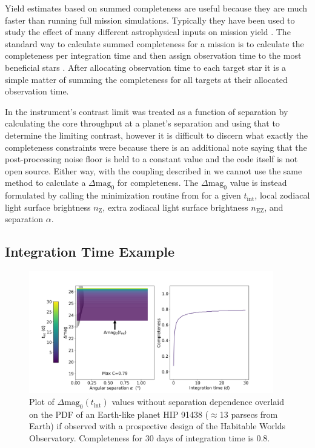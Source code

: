 Yield estimates based on summed completeness are useful because they are much
faster than running full mission simulations. Typically they have been used to
study the effect of many different astrophysical inputs on mission yield
\citep{starkMaximizingExoEarthCandidate2014, Stark2016,
starkExoEarthYieldLandscape2019}. The standard way to calculate summed
completeness for a mission is to calculate the completeness per integration
time and then assign observation time to the most beneficial stars
\citep{hunyadiSingleVisitCompleteness2005,
starkMaximizingExoEarthCandidate2014}. After allocating observation time to
each target star it is a simple matter of summing the completeness for all
targets at their allocated observation time.

In \citep{starkExoEarthYieldLandscape2019} the instrument's contrast limit was
treated as a function of separation by calculating the core throughput at a
planet's separation and using that to determine the limiting contrast, however
it is difficult to discern what exactly the completeness constraints were because
there is an additional note saying that the post-processing noise floor is held to a constant
value and the code itself is not open source. Either way, with the
coupling described in  we cannot use the same method to calculate
a $\Delta\textrm{mag}_0$ for completeness. The $\Delta\textrm{mag}_0$ value is instead
formulated by calling the minimization routine from  
for a given $t_\textrm{int}$, local zodiacal light surface brightness $n_\textrm{Z}$,
extra zodiacal light surface brightness $n_\textrm{EZ}$, and separation $\alpha$.

\subsection{Integration Time Example}
\label{sub:comp_per_inttime}

\begin{figure}
  \begin{center}
    \includegraphics[width=0.95\textwidth]{ch3/figures/default_dmag_curve.png}
  \end{center}
  \caption{Plot of $\Delta\textrm{mag}_0(t_\textrm{int})$ values without separation dependence
  overlaid on the PDF of an Earth-like planet HIP 91438 ($\approx$13 parsecs from Earth)
  if observed with a prospective design of the Habitable Worlds Observatory.
  Completeness for 30 days of integration time is 0.8.}
  \label{fig:default_dmag_curve}
\end{figure}

